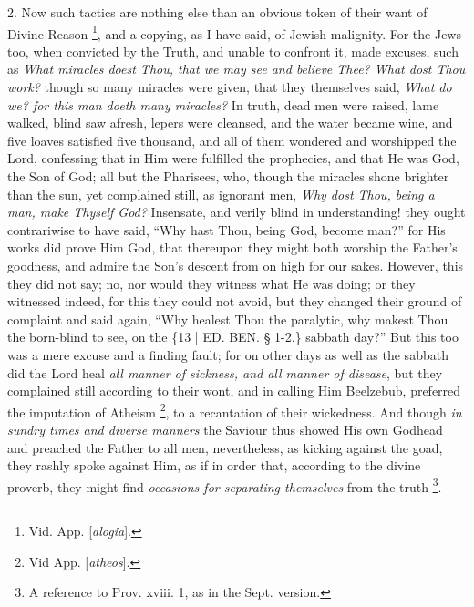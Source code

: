 2. Now such tactics are
nothing else than an obvious token of their want of Divine Reason \footnote{Vid. App. [\emph{alogia}].}, and a copying, as I have said, of Jewish malignity. For the
Jews too, when convicted by the Truth, and unable to confront it, made
excuses, such as \emph{What miracles doest Thou, that we may see and
believe Thee? What dost Thou work?} though so many miracles were
given, that they themselves said, \emph{What do we? for this man doeth
many miracles?} In truth, dead men were raised, lame walked, blind
saw afresh, lepers were cleansed, and the water became wine, and five
loaves satisfied five thousand, and all of them wondered and
worshipped the Lord, confessing that in Him were fulfilled the
prophecies, and that He was God, the Son of God; all but the
Pharisees, who, though the miracles shone brighter than the sun, yet
complained still, as ignorant men, \emph{Why dost Thou, being a man, make
Thyself God?} Insensate, and verily blind in understanding! they
ought contrariwise to have said, ``Why hast Thou, being God, become
man?'' for His works did prove Him God, that thereupon they might both
worship the Father's goodness, and admire the Son's descent from on
high for our sakes. However, this they did not say; no, nor would they
witness what He was doing; or they witnessed indeed, for this they
could not avoid, but they changed their ground of complaint and said
again, ``Why healest Thou the paralytic, why makest Thou the born-blind
to see, on the \{13 | ED. BEN.
§ 1-2.\} sabbath day?'' But this too was a mere excuse and a finding
fault; for on other days as well as the sabbath did the Lord heal \emph{all
manner of sickness, and all manner of disease}, but they complained
still according to their wont, and in calling Him Beelzebub, preferred
the imputation of Atheism \footnote{Vid App. [\emph{atheos}].},
to a recantation of their wickedness. And though \emph{in sundry times
and diverse manners} the Saviour thus showed His own Godhead and
preached the Father to all men, nevertheless, as kicking against the
goad, they rashly spoke against Him, as if in order that, according to
the divine proverb, they might find \emph{occasions for separating
themselves} from the truth \footnote{A reference to Prov. xviii. 1, as in the Sept. version.}.

